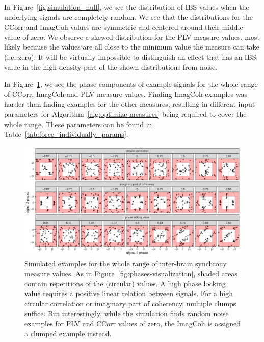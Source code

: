 In Figure~\ref{fig:simulation_null}, we see the distribution of IBS values
when the underlying signals are completely random. We see that the distributions
for the CCorr and ImagCoh values are symmetric and centered around their middle
value of zero. We observe a skewed distribution for the PLV measure values, most
likely because the values are all close to the minimum value the measure can
take (i.e. zero). It will be virtually impossible to distinguish an effect
that has an IBS value in the high density part of the shown distributions
from noise.

In Figure~\ref{fig:simulation_force_individually}, we see the phase components
of example signals for the whole range of CCorr, ImagCoh and PLV measure values.
Finding ImagCoh examples was harder than finding examples for the other
measures, resulting in different input parameters for
Algorithm~\ref{alg:optimize-measures} being required to cover the whole range.
These parameters can be found in Table~\ref{tab:force_individually_params}.

\begin{landscape}
  \begin{figure}
    \includegraphics[width=\linewidth]{../stats/results/simulation_force_individually.pdf}
    \caption{Simulated examples for the whole range of inter-brain synchrony measure values. As in Figure~\ref{fig:phases-visualization}, shaded areas contain repetitions of the (circular) values. A high phase locking value requires a positive linear relation between signals. For a high circular correlation or imaginary part of coherency, multiple clumps suffice. But interestingly, while the simulation finds random noise examples for PLV and CCorr values of zero, the ImagCoh is assigned a clumped example instead.}
    \label{fig:simulation_force_individually}
  \end{figure}
\end{landscape}


